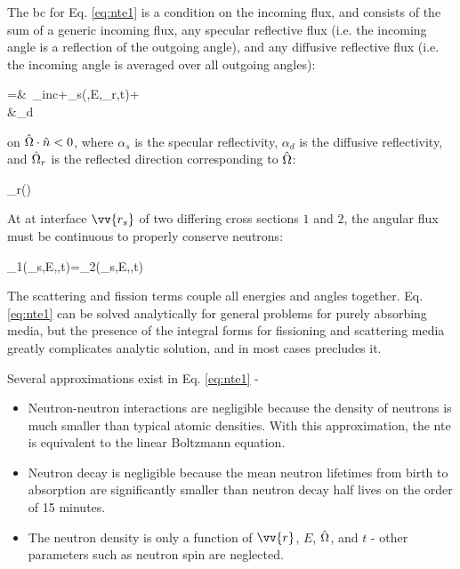 The \gls{bc} for Eq. \eqref{eq:nte1} is a condition on the incoming flux, and consists of the sum of a generic incoming flux, any specular reflective flux (i.e. the incoming angle is a reflection of the outgoing angle), and any diffusive reflective flux (i.e. the incoming angle is averaged over all outgoing angles):

\beqa
\label{eq:NTEBCs}
\psi\seat=&\ \psi_{inc}\seat+\alpha_s\seat\psi(,E,\hO_r,t)+\\
&\hspace{1cm}\alpha_d\seat{}
\eeqa

on \(\hat{\Omega}\cdot\hat{n}<0\), where \(\alpha_s\) is the specular reflectivity, \(\alpha_d\) is the diffusive reflectivity, and \(\hat{\Omega}_r\) is the reflected direction corresponding to \(\hat{\Omega}\):

\beq
\label{eq:hOrDef}
\hO_r\equiv{}\left(\hO\cdot{}\right)
\eeq

At at interface \(\vv{r_s}\) of two differing cross sections \(1\) and \(2\), the angular flux must be continuous to properly conserve neutrons:

\beq
\label{eq:NTE_interface}
\psi_1(_s,E,\hO,t)=\psi_2(_s,E,\hO,t)
\eeq

The scattering and fission terms couple all energies and angles together. Eq. \eqref{eq:nte1} can be solved analytically for general problems for purely absorbing media, but the presence of the integral forms for fissioning and scattering media greatly complicates analytic solution, and in most cases precludes it. 

Several approximations exist in Eq. \eqref{eq:nte1} -

\begin{itemize}
\item Neutron-neutron interactions are negligible because the density of neutrons is much smaller than typical atomic densities. With this approximation, the \gls{nte} is equivalent to the linear Boltzmann equation.
\item Neutron decay is negligible because the mean neutron lifetimes from birth to absorption are significantly smaller than neutron decay half lives on the order of 15 minutes.
\item The neutron density is only a function of \(\vv{r}\), \(E\), \(\hat{\Omega}\), and \(t\) - other parameters such as neutron spin are neglected.
\end{itemize}

